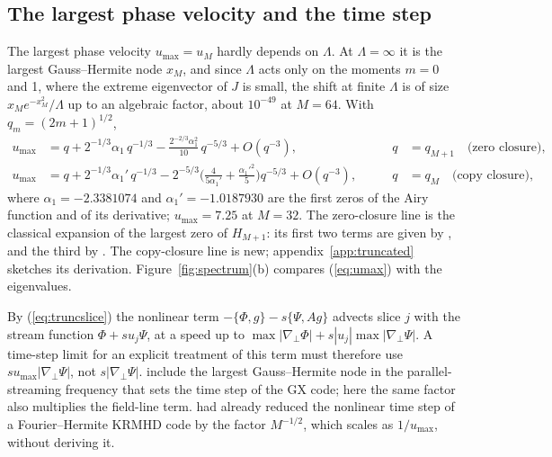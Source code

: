 \subsection{The largest phase velocity and the time step}

The largest phase velocity $u_{\max}=u_M$ hardly depends on $\Lambda$. At $\Lambda=\infty$ it is the largest Gauss--Hermite node $x_M$, and since $\Lambda$ acts only on the moments $m=0$ and 1, where the extreme eigenvector of $J$ is small, the shift at finite $\Lambda$ is of size $x_Me^{-x_M^2}/\Lambda$ up to an algebraic factor, about $10^{-49}$ at $M=64$. With $q_m=(2m+1)^{1/2}$,
\begin{equation}\label{eq:umax}
\begin{aligned}
  u_{\max}&=q+2^{-1/3}\alpha_1\,q^{-1/3}-\frac{2^{-2/3}\alpha_1^2}{10}\,q^{-5/3}+O(q^{-3}),&\qquad q&=q_{M+1}\quad\text{(zero closure)},\\
  u_{\max}&=q+2^{-1/3}\alpha_1'\,q^{-1/3}-2^{-5/3}\Big(\frac{4}{5\alpha_1'}+\frac{\alpha_1'^2}{5}\Big)q^{-5/3}+O(q^{-3}),&\qquad q&=q_M\quad\text{(copy closure)},
\end{aligned}
\end{equation}
where $\alpha_1=-2.3381074$ and $\alpha_1'=-1.0187930$ are the first zeros of the Airy function and of its derivative; $u_{\max}=7.25$ at $M=32$. The zero-closure line is the classical expansion of the largest zero of $H_{M+1}$: its first two terms are given by \citet[theorem~6.32]{Szego1975} \citep[see also][eq.~18.16.17]{DLMF}, and the third by \citet{Olver1959} \citep[eqs~12.7.2 and~12.11.9]{DLMF}. The copy-closure line is new; appendix~\ref{app:truncated} sketches its derivation. Figure~\ref{fig:spectrum}(b) compares (\ref{eq:umax}) with the eigenvalues.

By (\ref{eq:truncslice}) the nonlinear term $-\{\Phi,g\}-s\{\Psi,Ag\}$ advects slice $j$ with the stream function $\Phi+su_j\Psi$, at a speed up to $\max|\nabla_\perp\Phi|+s|u_j|\max|\nabla_\perp\Psi|$. A time-step limit for an explicit treatment of this term must therefore use $su_{\max}|\nabla_\perp\Psi|$, not $s|\nabla_\perp\Psi|$. \citet[eq.~5.3]{Mandell2024} include the largest Gauss--Hermite node in the parallel-streaming frequency that sets the time step of the GX code; here the same factor also multiplies the field-line term. \citet[eq.~2.26]{KanekarThesis2015} had already reduced the nonlinear time step of a Fourier--Hermite KRMHD code by the factor $M^{-1/2}$, which scales as $1/u_{\max}$, without deriving it.
